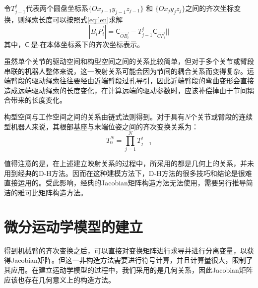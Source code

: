 	令$T_{j-1}^{j}$代表两个圆盘坐标系$\{O x_{j-1} y_{j-1} z_{j-1}\}$ 和 $\{O x_{j} y_{j} z_{j}\}$之间的齐次坐标变换，则绳索长度可以按照式\ref{eq:len}求解
	\begin{equation}
	| \overrightarrow{B_i P_i} | = \mathsf{C}_{\overrightarrow{OB_i}} - T_{j-1}^{j} \mathsf{C}_{\overrightarrow{C P_i}}  ||
	\label{eq:len}
	\end{equation}
	其中，$\mathsf{C}_{\cdot} $是$\cdot$在本体坐标系下的齐次坐标表示。
	
	虽然单个关节的驱动空间和构型空间之间的关系比较简单，但对于多个关节或臂段串联的机器人整体来说，这一映射关系可能会因为节间的耦合关系而变得复杂。远端臂段的驱动绳索往往要经由近端臂段过孔导引，因此近端臂段的弯曲变形会直接造成远端驱动绳索的长度变化，在计算远端的驱动参数时，应该补偿掉由于节间耦合带来的长度变化。
	
	构型空间与工作空间之间的关系由链式法则得到。对于具有$N$个关节或臂段的连续型机器人来说，其根部基座与末端位姿之间的齐次变换关系为：
	\begin{equation}
	T_{0}^{N} = \prod_{j=1}^{N} T_{j-1}^{j}
	\label{eq:chain}
	\end{equation}
	
	值得注意的是，在上述建立映射关系的过程中，所采用的都是几何上的关系，并未用到经典的D-H方法。因而在这种建模方法下，D-H方法的很多技巧和结论是很难直接运用的。受此影响，经典的Jacobian矩阵构造方法无法使用，需要另行推导简洁的雅可比矩阵构造方法。
	
	
	
	
\section{微分运动学模型的建立}
	得到机械臂的齐次变换之后，可以直接对变换矩阵进行求导并进行分离变量，以获得Jacobian矩阵\cite{hannan_kinematics_2003}。但这一非构造方法需要进行符号计算，并且计算量很大，限制了其应用。在建立运动学模型的过程中，我们采用的是几何关系，因此Jacobian矩阵应该也存在几何意义上的构造方法。
	
